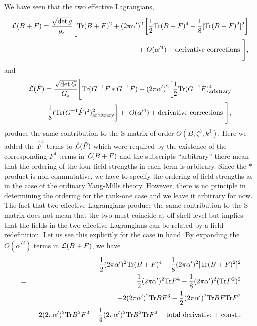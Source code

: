 \documentclass[a4paper,12pt]{article}
\begin{document}
We have seen that the two effective Lagrangians,
\begin{eqnarray}
{\cal L}(B+F) = \frac{\sqrt{\det g}}{g_s} \Biggl[
{\rm Tr} (B+F)^2
+ (2 \pi \alpha')^2 \left[
\frac{1}{2} {\rm Tr} (B+F)^4
-\frac{1}{8} [ {\rm Tr} (B+F)^2 ]^2 \right]
\nonumber \\
+ ~O(\alpha'^4) + {\rm derivative~corrections~}
\Biggr],
\end{eqnarray}
and
\begin{eqnarray}
\hat{{\cal L}}(\hat{F}) = \frac{\sqrt{\det G}}{G_s} \Biggl[
{\rm Tr} ( G^{-1} \hat{F} \ast G^{-1} \hat{F} )
+ (2 \pi \alpha')^2 \biggl[
\frac{1}{2} {\rm Tr} ( G^{-1} \hat{F} )^4_{\rm arbitrary}
\nonumber \\
-\frac{1}{8} ( {\rm Tr} ( G^{-1} \hat{F} )^2 )^2_{\rm arbitrary}
\biggr]
+ ~O(\alpha'^4) + {\rm derivative~corrections~}
\Biggr],
\label{L-hat-4}
\end{eqnarray}
produce the same contribution to the S-matrix
of order $O(B, \zeta^3, k^3)$.
Here we added the $\hat{F}^4$ terms to $\hat{{\cal L}}(\hat{F})$
which were required by the existence of the corresponding
$F^4$ terms in ${\cal L}(B+F)$
and the subscripts ``arbitrary'' there mean
that the ordering of the four field strengths
in each term is arbitrary.
Since the $\ast$ product is non-commutative,
we have to specify the ordering of field strengths
as in the case of the ordinary Yang-Mills theory.
However, there is no principle in determining the ordering
for the rank-one case and we leave it arbitrary for now.
The fact that two effective Lagrangians produce
the same contribution to the S-matrix
does not mean that the two must coincide at off-shell level
but implies that the fields in the two effective Lagrangians
can be related by a field redefinition.
Let us see this explicitly for the case in hand.
By expanding the $O(\alpha'^2)$ terms in ${\cal L}(B+F)$,
we have
\begin{eqnarray}
&& \frac{1}{2} (2 \pi \alpha')^2 {\rm Tr} (B+F)^4
-\frac{1}{8} (2 \pi \alpha')^2 [ {\rm Tr} (B+F)^2 ]^2
\nonumber \\
&=& \frac{1}{2} (2 \pi \alpha')^2 {\rm Tr} F^4
-\frac{1}{8} (2 \pi \alpha')^2 ( {\rm Tr} F^2 )^2
\nonumber \\
&& +2 (2 \pi \alpha')^2 {\rm Tr} BF^3
-\frac{1}{2} (2 \pi \alpha')^2 {\rm Tr} BF {\rm Tr} F^2
\nonumber \\
&& +2 (2 \pi \alpha')^2 {\rm Tr} B^2 F^2
-\frac{1}{4} (2 \pi \alpha')^2 {\rm Tr} B^2 {\rm Tr} F^2
+ {\rm total~derivative} + {\rm const.},
\label{(B+F)^4}
\end{eqnarray}
\end{document}
